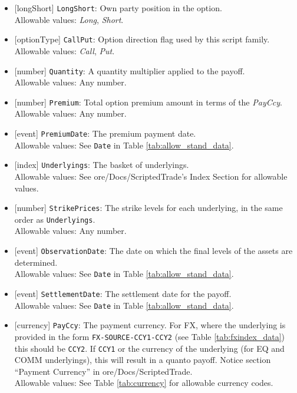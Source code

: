 \begin{itemize}
  \item{}[longShort] \lstinline!LongShort!: Own party position in the option. \\
  Allowable values: \emph{Long}, \emph{Short}.
  \item{}[optionType] \lstinline!CallPut!: Option direction flag used by this script family. \\
  Allowable values: \emph{Call}, \emph{Put}.
  \item{}[number] \lstinline!Quantity!: A quantity multiplier applied to the payoff. \\
  Allowable values: Any number.
  \item{}[number] \lstinline!Premium!: Total option premium amount in terms of the \emph{PayCcy}. \\
  Allowable values: Any number.
  \item{}[event] \lstinline!PremiumDate!: The premium payment date. \\
  Allowable values: See \lstinline!Date! in Table \ref{tab:allow_stand_data}.
  \item{}[index] \lstinline!Underlyings!: The basket of underlyings. \\
  Allowable values: See ore/Docs/ScriptedTrade's Index Section for allowable values.
  \item{}[number] \lstinline!StrikePrices!: The strike levels for each underlying, in the same order as \lstinline!Underlyings!. \\
  Allowable values: Any number.
  \item{}[event] \lstinline!ObservationDate!: The date on which the final levels of the assets are determined. \\
  Allowable values: See \lstinline!Date! in Table \ref{tab:allow_stand_data}.
  \item{}[event] \lstinline!SettlementDate!: The settlement date for the payoff. \\
  Allowable values: See \lstinline!Date! in Table \ref{tab:allow_stand_data}.
  \item{}[currency] \lstinline!PayCcy!: The payment currency. For FX, where the underlying is provided
      in the form \lstinline!FX-SOURCE-CCY1-CCY2! (see Table \ref{tab:fxindex_data}) this should
      be \lstinline!CCY2!. If \lstinline!CCY1! or the currency of the underlying (for EQ and
      COMM underlyings), this will result in a quanto payoff. Notice section ``Payment Currency'' in ore/Docs/ScriptedTrade. \\
        Allowable values: See Table \ref{tab:currency} for allowable currency codes.
\end{itemize}

